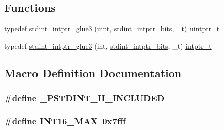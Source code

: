 \subsection*{Functions}
\begin{DoxyCompactItemize}
\item 
typedef \hyperlink{orstdint_8h_a201ed50f6feec4433965bdf9b9fc5e82}{stdint\-\_\-intptr\-\_\-glue3} (uint, \hyperlink{orstdint_8h_a7920cf8565293f3312fe4a5a8829483b}{stdint\-\_\-intptr\-\_\-bits}, \-\_\-t) \hyperlink{stdint_8h_a31b85deecb45924320becd11d3ee16ce}{uintptr\-\_\-t}
\item 
typedef \hyperlink{orstdint_8h_a45b6674a3fc19b6f9017e8eff6de40f2}{stdint\-\_\-intptr\-\_\-glue3} (int, \hyperlink{orstdint_8h_a7920cf8565293f3312fe4a5a8829483b}{stdint\-\_\-intptr\-\_\-bits}, \-\_\-t) \hyperlink{stdint_8h_a8849b1e6d66a4902c0ac1d257a0a91f0}{intptr\-\_\-t}
\end{DoxyCompactItemize}


\subsection{Macro Definition Documentation}
\subsubsection[{\-\_\-\-P\-S\-T\-D\-I\-N\-T\-\_\-\-H\-\_\-\-I\-N\-C\-L\-U\-D\-E\-D}]{\setlength{\rightskip}{0pt plus 5cm}\#define \-\_\-\-P\-S\-T\-D\-I\-N\-T\-\_\-\-H\-\_\-\-I\-N\-C\-L\-U\-D\-E\-D}\label{orstdint_8h_a91cbfa927fe8e3fc657296bfe67849a6}
\subsubsection[{I\-N\-T16\-\_\-\-M\-A\-X}]{\setlength{\rightskip}{0pt plus 5cm}\#define I\-N\-T16\-\_\-\-M\-A\-X~0x7fff}\label{orstdint_8h_ac58f2c111cc9989c86db2a7dc4fd84ca}
